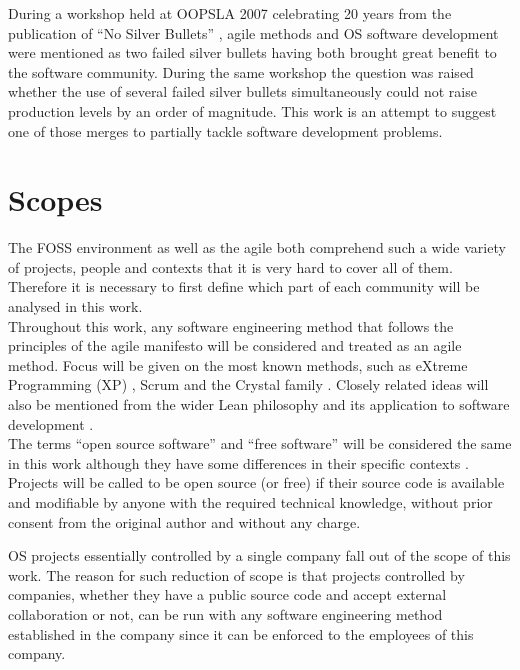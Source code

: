 \documentclass[lnbip]{svmultln}
\begin{document}
During a workshop \cite{conference:oopsla2007} held at OOPSLA 2007
celebrating 20 years from the publication of ``No Silver Bullets''
\cite{brooks1987}, agile methods and OS software development were
mentioned as two failed silver bullets having both brought great
benefit to the software community. During the same workshop the
question was raised whether the use of several failed silver bullets
simultaneously could not raise production levels by an order of
magnitude. This work is an attempt to suggest one of those merges to
partially tackle software development problems.


\section{Scopes}
\label{sec:scope}

The FOSS environment as well as the agile both comprehend such a wide
variety of projects, people and contexts that it is very hard to cover
all of them. Therefore it is necessary to first define which part of
each community will be analysed in this work.
\\

Throughout this work, any software engineering method that follows the
principles of the agile manifesto \cite{url:agilemanifesto} will be
considered and treated as an agile method. Focus will be given on the
most known methods, such as eXtreme Programming (XP) \cite{XP2002},
Scrum \cite{schwaber2004} and the Crystal family
\cite{cockburn2002}. Closely related ideas will also be mentioned from
the wider Lean philosophy \cite{ohno1998} and its application to
software development \cite{poppendieck2005}.
\\

The terms ``open source software'' and ``free software'' will be
considered the same in this work although they have some differences
in their specific contexts \cite[Ch. 1, Free Versus Open
source]{fogel2005}. Projects will be called to be open source (or
free) if their source code is available and modifiable by anyone with
the required technical knowledge, without prior consent from the
original author and without any charge.

OS projects essentially controlled by a single company fall out of the
scope of this work. The reason for such reduction of scope is that
projects controlled by companies, whether they have a public source
code and accept external collaboration or not, can be run with any
software engineering method established in the company since it can be
enforced to the employees of this company.
\end{document}

